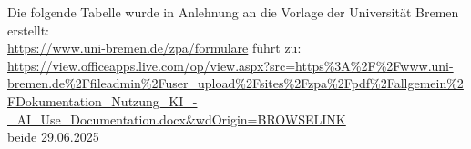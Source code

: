 
Die folgende Tabelle wurde in Anlehnung an die Vorlage der Universität Bremen erstellt:
\\

\footnotesize{
    \url{https://www.uni-bremen.de/zpa/formulare} führt zu: 
    \\

    \url{https://view.officeapps.live.com/op/view.aspx?src=https%3A%2F%2Fwww.uni-bremen.de%2Ffileadmin%2Fuser_upload%2Fsites%2Fzpa%2Fpdf%2Fallgemein%2FDokumentation_Nutzung_KI_-_AI_Use_Documentation.docx&wdOrigin=BROWSELINK} 
    \\
    
    beide 29.06.2025
    }


\clearpage


